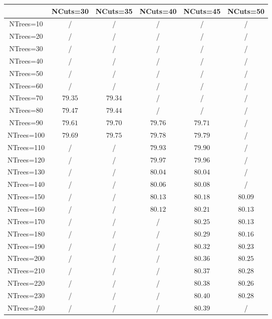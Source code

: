 \centering
\begin{tabular}{|c|c|c|c|c|c|} \hline
 & NCuts=30 & NCuts=35 & NCuts=40 & NCuts=45 & NCuts=50\\\hline
NTrees=10 &  / &  / &  / &  / &  /\\\hline
NTrees=20 &  / &  / &  / &  / &  /\\\hline
NTrees=30 &  / &  / &  / &  / &  /\\\hline
NTrees=40 &  / &  / &  / &  / &  /\\\hline
NTrees=50 &  / &  / &  / &  / &  /\\\hline
NTrees=60 &  / &  / &  / &  / &  /\\\hline
NTrees=70 & $79.35$ & $79.34$ &  / &  / &  /\\\hline
NTrees=80 & $79.47$ & $79.44$ &  / &  / &  /\\\hline
NTrees=90 & $79.61$ & $79.70$ & $79.76$ & $79.71$ &  /\\\hline
NTrees=100 & $79.69$ & $79.75$ & $79.78$ & $79.79$ &  /\\\hline
NTrees=110 &  / &  / & $79.93$ & $79.90$ &  /\\\hline
NTrees=120 &  / &  / & $79.97$ & $79.96$ &  /\\\hline
NTrees=130 &  / &  / & $80.04$ & $80.04$ &  /\\\hline
NTrees=140 &  / &  / & $80.06$ & $80.08$ &  /\\\hline
NTrees=150 &  / &  / & $80.13$ & $80.18$ & $80.09$\\\hline
NTrees=160 &  / &  / & $80.12$ & $80.21$ & $80.13$\\\hline
NTrees=170 &  / &  / &  / & $80.25$ & $80.13$\\\hline
NTrees=180 &  / &  / &  / & $80.29$ & $80.16$\\\hline
NTrees=190 &  / &  / &  / & $80.32$ & $80.23$\\\hline
NTrees=200 &  / &  / &  / & $80.36$ & $80.25$\\\hline
NTrees=210 &  / &  / &  / & $80.37$ & $80.28$\\\hline
NTrees=220 &  / &  / &  / & $80.38$ & $80.26$\\\hline
NTrees=230 &  / &  / &  / & $80.40$ & $80.28$\\\hline
NTrees=240 &  / &  / &  / & $80.39$ &  /\\\hline
\end{tabular}
